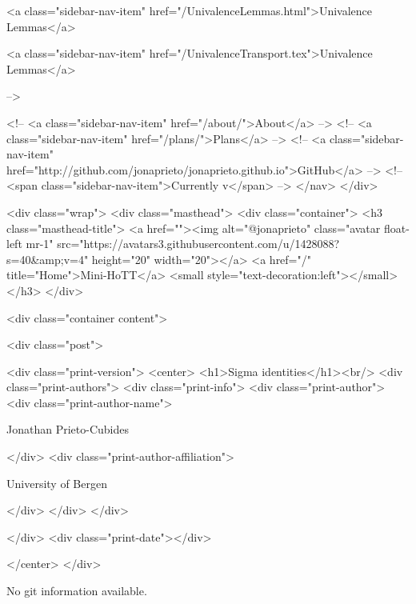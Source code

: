       
    
      
        
          <a class="sidebar-nav-item" href="/UnivalenceLemmas.html">Univalence Lemmas</a>
        
      
    
      
        
          <a class="sidebar-nav-item" href="/UnivalenceTransport.tex">Univalence Lemmas</a>
        
      
     -->

    <!-- <a class="sidebar-nav-item" href="/about/">About</a> -->
    <!-- <a class="sidebar-nav-item" href="/plans/">Plans</a> -->
    <!-- <a class="sidebar-nav-item" href="http://github.com/jonaprieto/jonaprieto.github.io">GitHub</a> -->
    <!-- <span class="sidebar-nav-item">Currently v</span> -->
  </nav>
</div>

    <div class="wrap">
      <div class="masthead">
        <div class="container">
          <h3 class="masthead-title">
            <a href=""><img alt="@jonaprieto" class="avatar float-left mr-1" src="https://avatars3.githubusercontent.com/u/1428088?s=40&amp;v=4" height="20" width="20"></a>
            <a href="/" title="Home">Mini-HoTT</a>
            <small style="text-decoration:left"></small>
          </h3>
        </div>
      
      <div class="container content">
        







<div class="post">

  <div class="print-version">
    <center>
      <h1>Sigma identities</h1><br/>
        <div class="print-authors">
          <div class="print-info">
            <div class="print-author">
              <div class="print-author-name">
                
                  Jonathan Prieto-Cubides
                
              </div>
              <div class="print-author-affiliation">
                
                  University of Bergen
                
                </div>
            </div>
          </div>
          
          
        </div>
        <div class="print-date"></div>
        
        
    </center>
  </div>

  
  No git information available.
  
